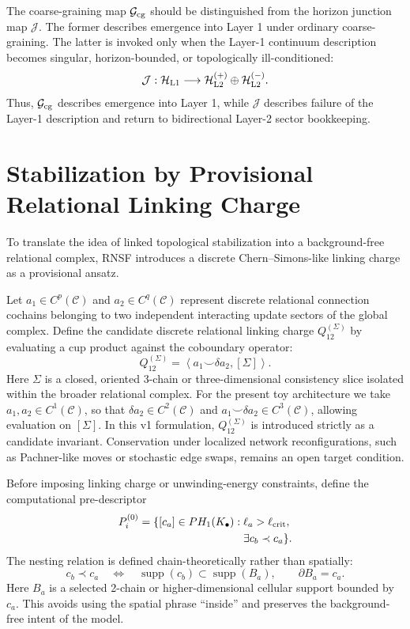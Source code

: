\documentclass[11pt]{article}
\newcommand{\Ccal}{\mathcal{C}}
\newcommand{\Hcal}{\mathcal{H}}
\newcommand{\Gcg}{\mathcal{G}_{\rm cg}}
\newcommand{\Jmap}{\mathcal{J}}
\newcommand{\Pre}{P_i^{(0)}}
\newcommand{\Qlink}{Q_{12}^{(\Sigma)}}
\newcommand{\supp}{\operatorname{supp}}
\begin{document}
The coarse-graining map \(\Gcg\) should be distinguished from the horizon junction map \(\Jmap\). The former describes emergence into Layer 1 under ordinary coarse-graining. The latter is invoked only when the Layer-1 continuum description becomes singular, horizon-bounded, or topologically ill-conditioned:
\begin{equation}
    \Jmap:
    \Hcal_{\rm L1}
    \longrightarrow
    \Hcal_{\rm L2}^{(+)}\oplus \Hcal_{\rm L2}^{(-)}.
\end{equation}
Thus, \(\Gcg\) describes emergence into Layer 1, while \(\Jmap\) describes failure of the Layer-1 description and return to bidirectional Layer-2 sector bookkeeping.

\section{Stabilization by Provisional Relational Linking Charge}
\label{sec:linking-charge}

To translate the idea of linked topological stabilization into a background-free relational complex, RNSF introduces a discrete Chern--Simons-like linking charge as a provisional ansatz.

Let \(a_1\in C^p(\Ccal)\) and \(a_2\in C^q(\Ccal)\) represent discrete relational connection cochains belonging to two independent interacting update sectors of the global complex. Define the candidate discrete relational linking charge \(\Qlink\) by evaluating a cup product against the coboundary operator:
\begin{equation}
    \Qlink=\left\langle a_1\smile\delta a_2,[\Sigma]\right\rangle.
\end{equation}
Here \(\Sigma\) is a closed, oriented 3-chain or three-dimensional consistency slice isolated within the broader relational complex. For the present toy architecture we take \(a_1,a_2\in C^1(\Ccal)\), so that \(\delta a_2\in C^2(\Ccal)\) and \(a_1\smile\delta a_2\in C^3(\Ccal)\), allowing evaluation on \([\Sigma]\). In this v1 formulation, \(\Qlink\) is introduced strictly as a candidate invariant. Conservation under localized network reconfigurations, such as Pachner-like moves or stochastic edge swaps, remains an open target condition.

Before imposing linking charge or unwinding-energy constraints, define the computational pre-descriptor
\begin{equation}
\begin{aligned}
    \Pre = \{[c_a]\in PH_1(K_\bullet):\;&
    \ell_a>\ell_{\rm crit},\\
    &\exists c_b\prec c_a\}.
\end{aligned}
\end{equation}
The nesting relation is defined chain-theoretically rather than spatially:
\begin{equation}
    c_b\prec c_a
    \quad\Longleftrightarrow\quad
    \supp(c_b)\subset\supp(B_a),
    \qquad
    \partial B_a=c_a.
\end{equation}
Here \(B_a\) is a selected 2-chain or higher-dimensional cellular support bounded by \(c_a\). This avoids using the spatial phrase ``inside'' and preserves the background-free intent of the model.
\end{document}
